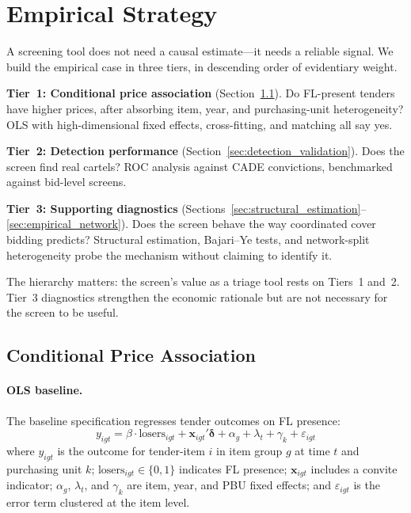 

\section{Empirical Strategy}
\label{sec:empirical}

A screening tool does not need a causal estimate---it needs a
reliable signal. We build the empirical case in three tiers, in
descending order of evidentiary weight.

\medskip
\noindent\textbf{Tier~1: Conditional price association}
(Section~\ref{sec:reduced_form}). Do FL-present tenders have
higher prices, after absorbing item, year, and purchasing-unit
heterogeneity? OLS with high-dimensional fixed effects,
cross-fitting, and matching all say yes.

\noindent\textbf{Tier~2: Detection performance}
(Section~\ref{sec:detection_validation}). Does the screen find
real cartels? ROC analysis against CADE convictions, benchmarked
against bid-level screens.

\noindent\textbf{Tier~3: Supporting diagnostics}
(Sections~\ref{sec:structural_estimation}--\ref{sec:empirical_network}).
Does the screen behave the way coordinated cover bidding predicts?
Structural estimation, Bajari--Ye tests, and network-split
heterogeneity probe the mechanism without claiming to identify it.

\medskip
\noindent The hierarchy matters: the screen's value as a triage
tool rests on Tiers~1 and~2. Tier~3 diagnostics strengthen the
economic rationale but are not necessary for the screen to be
useful.


\subsection{Conditional Price Association}
\label{sec:reduced_form}

\paragraph{OLS baseline.}
The baseline specification regresses tender outcomes on FL presence:
\begin{equation}
  y_{igt} = \beta \cdot \text{losers}_{igt} + \mathbf{x}_{igt}'
  \boldsymbol{\delta} + \alpha_g + \lambda_t + \gamma_k + \varepsilon_{igt}
  \label{eq:ols_main}
\end{equation}
where $y_{igt}$ is the outcome for tender-item $i$ in item group $g$ at
time $t$ and purchasing unit $k$; $\text{losers}_{igt} \in \{0,1\}$
indicates FL presence; $\mathbf{x}_{igt}$ includes a convite indicator;
$\alpha_g$, $\lambda_t$, and $\gamma_k$ are item, year, and PBU fixed
effects; and $\varepsilon_{igt}$ is the error term clustered at the item
level.

